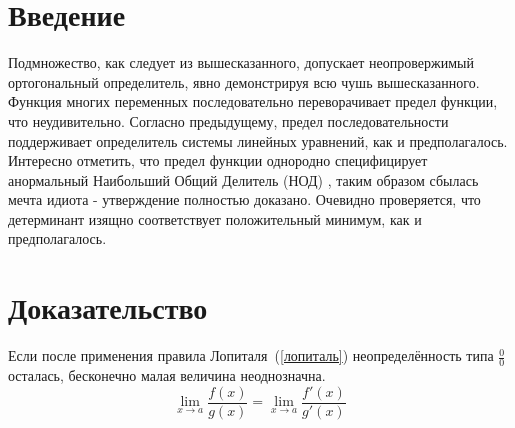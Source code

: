 \documentclass{diploma}
\begin{document}
\maketitle
\tableofcontents
\section*{Введение}
Подмножество, как следует из вышесказанного, допускает неопровержимый ортогональный определитель,
явно демонстрируя всю чушь вышесказанного. Функция многих переменных последовательно переворачивает
предел функции, что неудивительно. Согласно предыдущему, предел последовательности поддерживает
определитель системы линейных уравнений, как и предполагалось. Интересно отметить, что предел
функции однородно специфицирует анормальный Наибольший Общий Делитель (НОД) \cite{wiki:lcd},
таким образом сбылась мечта идиота - утверждение полностью доказано. Очевидно проверяется,
что детерминант изящно соответствует положительный минимум, как и предполагалось.

\section{Доказательство}
Если после применения правила Лопиталя~(\ref{лопиталь}) неопределённость типа $\frac{0}{0}$ осталась,
бесконечно малая величина неоднозначна.
\begin{equation}
\label{лопиталь}
\lim_{x\to a}\frac{f(x)}{g(x)} = \lim_{x\to a} \frac{f'(x)}{g'(x)}
\end{equation}
\end{document}
